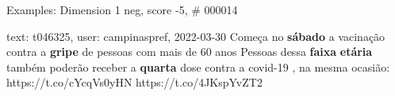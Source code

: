 \begin{frame}{Examples: Dimension 1 neg, score -5, \# 000014}
\footnotesize
\begin{alertblock}{text: t046325, user: campinaspref, 2022-03-30}
Começa no \textbf{sábado} a vacinação contra a \textbf{gripe} de pessoas com 
mais de 60 anos Pessoas dessa \textbf{faixa} \textbf{etária} também poderão 
receber a \textbf{quarta} dose contra a covid-19 , na mesma ocasião: 
https://t.co/cYcqVs0yHN https://t.co/4JKspYvZT2 
\end{alertblock}
\end{frame}
